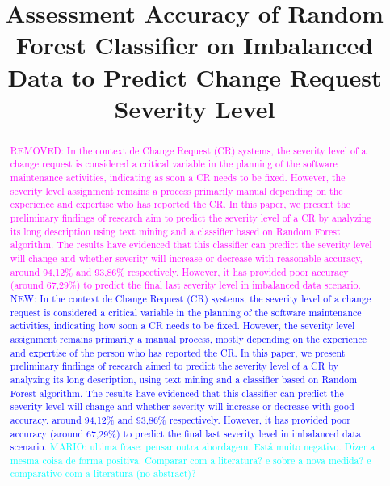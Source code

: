 \documentclass[10pt, conference]{IEEEtran}
\newcommand{\mario}[1]{\noindent\textcolor{cyan}{MARIO: {#1}}}
\newcommand{\rem}[1]{\noindent\textcolor{magenta}{REMOVED: {#1}}}
\newcommand{\new}[1]{\noindent\textcolor{blue}{NEW: {#1}}}
\newcommand{\mario}[1]{}
\newcommand{\rem}[1]{}
\newcommand{\new}[1]{#1}
\begin{document}
\title{Assessment Accuracy of Random Forest Classifier on Imbalanced Data to Predict Change Request Severity Level}

\author{
\and
{}
}

\maketitle

\begin{abstract}
\rem{In the context de Change Request (CR) systems, the severity level of a change request is considered a critical variable in the planning of the software maintenance activities, indicating as soon a CR needs to be fixed. However, the severity level assignment remains a process primarily manual depending on the experience and expertise who has reported the CR. In this paper, we present the preliminary findings of research aim to predict the severity level of a CR by analyzing its long description using text mining and a classifier based on Random Forest algorithm. The results have evidenced that this classifier can predict the severity level will change and whether severity will increase or decrease with reasonable accuracy, around 94,12\% and 93,86\% respectively. However, it has provided poor accuracy (around 67,29\%) to predict the final last severity level in imbalanced data scenario.} \new{In the context de Change Request (CR) systems, the severity level of a change request is considered a critical variable in the planning of the software maintenance activities, indicating how soon a CR needs to be fixed. However, the severity level assignment remains primarily a manual process, mostly depending on the experience and expertise of the person who has reported the CR. In this paper, we present preliminary findings of research aimed to predict the severity level of a CR by analyzing its long description, using text mining and a classifier based on Random Forest algorithm. The results have evidenced that this classifier can predict the severity level will change and whether severity will increase or decrease with good accuracy, around 94,12\% and 93,86\% respectively. However, it has provided poor accuracy (around 67,29\%) to predict the final last severity level in imbalanced data scenario.} \mario{ultima frase: pensar outra abordagem. Está muito negativo. Dizer a mesma coisa de forma positiva. Comparar com a literatura?
e sobre a nova medida? e comparativo com a literatura (no abstract)?}

\end{abstract}
\end{document}
